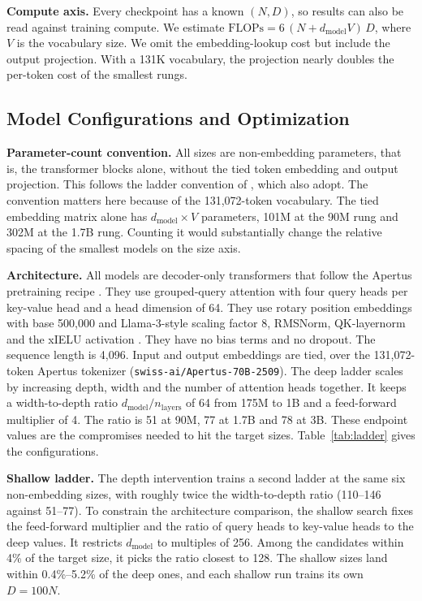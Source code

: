 \textbf{Compute axis.} Every checkpoint has a known $(N, D)$, so results can also be read against training compute. We estimate $\mathrm{FLOPs} = 6\,(N + d_{\mathrm{model}} V)\,D$, where $V$ is the vocabulary size. We omit the embedding-lookup cost but include the output projection. With a 131K vocabulary, the projection nearly doubles the per-token cost of the smallest rungs.

\subsection{Model Configurations and Optimization}
\label{app:model-configurations}

\textbf{Parameter-count convention.} All sizes are non-embedding parameters, that is, the transformer blocks alone, without the tied token embedding and output projection. This follows the ladder convention of \citet{bhagia_establishing_2025}, which \citet{heineman_signal_2025} also adopt. The convention matters here because of the 131,072-token vocabulary. The tied embedding matrix alone has $d_{\mathrm{model}} \times V$ parameters, 101M at the 90M rung and 302M at the 1.7B rung. Counting it would substantially change the relative spacing of the smallest models on the size axis.

\textbf{Architecture.} All models are decoder-only transformers that follow the Apertus pretraining recipe \citep{apertus_apertus_2025}. They use grouped-query attention \citep{ainslie_gqa_2023} with four query heads per key-value head and a head dimension of 64. They use rotary position embeddings \citep{su_roformer_2023} with base 500,000 and Llama-3-style scaling factor 8, RMSNorm, QK-layernorm and the xIELU activation \citep{huang_xielu_2025}. They have no bias terms and no dropout. The sequence length is 4,096. Input and output embeddings are tied, over the 131,072-token Apertus tokenizer (\texttt{swiss-ai/Apertus-70B-2509}). The deep ladder scales by increasing depth, width and the number of attention heads together. It keeps a width-to-depth ratio $d_{\mathrm{model}}/n_{\mathrm{layers}}$ of 64 from 175M to 1B and a feed-forward multiplier of 4. The ratio is 51 at 90M, 77 at 1.7B and 78 at 3B. These endpoint values are the compromises needed to hit the target sizes. Table~\ref{tab:ladder} gives the configurations.

\textbf{Shallow ladder.} The depth intervention trains a second ladder at the same six non-embedding sizes, with roughly twice the width-to-depth ratio (110--146 against 51--77). To constrain the architecture comparison, the shallow search fixes the feed-forward multiplier and the ratio of query heads to key-value heads to the deep values. It restricts $d_{\mathrm{model}}$ to multiples of 256. Among the candidates within 4\% of the target size, it picks the ratio closest to 128. The shallow sizes land within 0.4\%--5.2\% of the deep ones, and each shallow run trains its own $D = 100N$.

